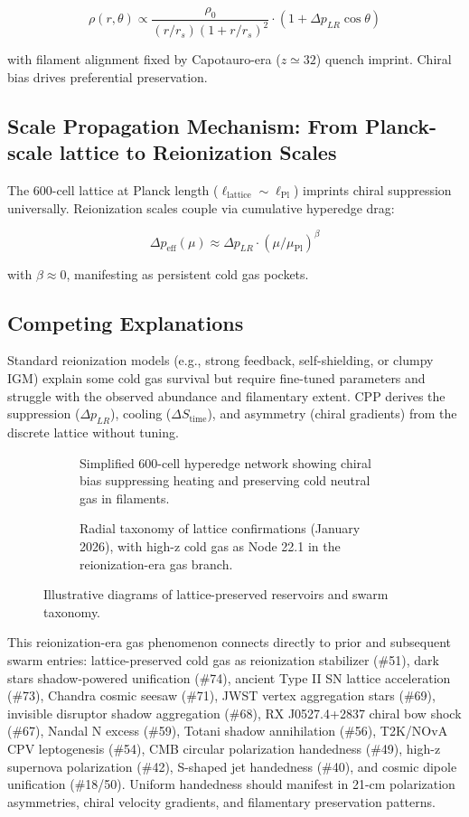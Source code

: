 \documentclass[11pt]{article}
\begin{document}
\[
\rho(r,\theta) \propto \frac{\rho_0}{(r/r_s)(1 + r/r_s)^2} \cdot (1 + \Delta p_{LR} \cos\theta)
\]

with filament alignment fixed by Capotauro-era ($z \simeq 32$) quench imprint. Chiral bias drives preferential preservation.

\subsection{Scale Propagation Mechanism: From Planck-scale lattice to Reionization Scales}
The 600-cell lattice at Planck length ($\ell_{\text{lattice}} \sim \ell_{\text{Pl}}$) imprints chiral suppression universally. Reionization scales couple via cumulative hyperedge drag:

\[
\Delta p_{\text{eff}}(\mu) \approx \Delta p_{LR} \cdot (\mu / \mu_{\text{Pl}})^\beta
\]

with $\beta \approx 0$, manifesting as persistent cold gas pockets.

\subsection{Competing Explanations}
Standard reionization models (e.g., strong feedback, self-shielding, or clumpy IGM) explain some cold gas survival but require fine-tuned parameters and struggle with the observed abundance and filamentary extent. CPP derives the suppression ($\Delta p_{LR}$), cooling ($\Delta S_{\text{time}}$), and asymmetry (chiral gradients) from the discrete lattice without tuning.

\begin{figure}[htbp]
\centering
\begin{subfigure}{0.45\textwidth}
\centering
\caption{Simplified 600-cell hyperedge network showing chiral bias suppressing heating and preserving cold neutral gas in filaments.}
\label{fig:lattice-coldgas}
\end{subfigure}
\hfill
\begin{subfigure}{0.45\textwidth}
\centering
\caption{Radial taxonomy of lattice confirmations (January 2026), with high-z cold gas as Node 22.1 in the reionization-era gas branch.}
\label{fig:taxonomy}
\end{subfigure}
\caption{Illustrative diagrams of lattice-preserved reservoirs and swarm taxonomy.}
\end{figure}

This reionization-era gas phenomenon connects directly to prior and subsequent swarm entries: lattice-preserved cold gas as reionization stabilizer (\#51), dark stars shadow-powered unification (\#74), ancient Type II SN lattice acceleration (\#73), Chandra cosmic seesaw (\#71), JWST vertex aggregation stars (\#69), invisible disruptor shadow aggregation (\#68), RX J0527.4+2837 chiral bow shock (\#67), Nandal N excess (\#59), Totani shadow annihilation (\#56), T2K/NOvA CPV leptogenesis (\#54), CMB circular polarization handedness (\#49), high-z supernova polarization (\#42), S-shaped jet handedness (\#40), and cosmic dipole unification (\#18/50). Uniform handedness should manifest in 21-cm polarization asymmetries, chiral velocity gradients, and filamentary preservation patterns.
\end{document}

